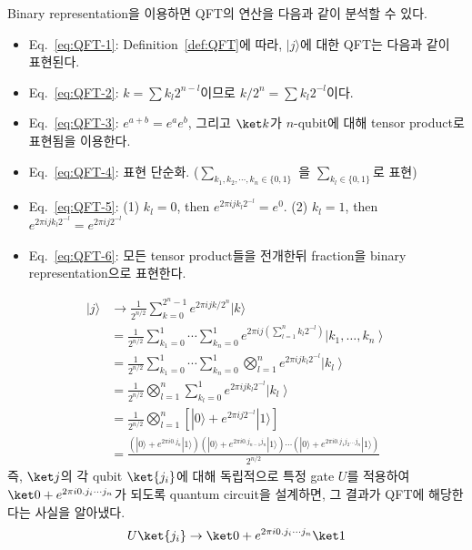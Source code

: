 \newpage
Binary representation을 이용하면 QFT의 연산을 다음과 같이 분석할 수 있다.
\begin{itemize}
  \item Eq.~\eqref{eq:QFT-1}: Definition~\ref{def:QFT}에 따라, $|j\rangle$에 대한 QFT는 다음과 같이 표현된다.
  \item Eq.~\eqref{eq:QFT-2}: $k = \sum k_l 2^{n-l}$이므로 $k/2^n = \sum k_l 2^{-l}$이다.
  \item Eq.~\eqref{eq:QFT-3}: $e^{a+b} = e^a e^b$, 그리고 $\ket k$가 $n$-qubit에 대해 tensor product로 표현됨을 이용한다.
  \item Eq.~\eqref{eq:QFT-4}: 표현 단순화. ($\sum_{k_1, k_2, \cdots, k_n \in \{0, 1\}}$ 을 $\sum_{k_l \in \{0, 1\}}$로 표현)
  \item Eq.~\eqref{eq:QFT-5}: (1) $k_l=0$, then $e^{2\pi ij k_l 2^{-l}} = e^0$. (2) $k_l=1$, then $e^{2\pi ij k_l 2^{-l}} = e^{2\pi i j 2^{-l}}$
  \item Eq.~\eqref{eq:QFT-6}: 모든 tensor product들을 전개한뒤 fraction을 binary representation으로 표현한다.
\end{itemize}
\begin{align}
  |j\rangle & \rightarrow \frac{1}{2^{n / 2}} \sum_{k=0}^{2^n-1} e^{2 \pi i j k / 2^n}|k\rangle \label{eq:QFT-1} \\
  & =\frac{1}{2^{n / 2}} \sum_{k_1=0}^1 \cdots \sum_{k_n=0}^1 e^{2 \pi i j\left(\sum_{l=1}^n k_l 2^{-l}\right)}\left|k_1, \ldots, k_n\right\rangle \label{eq:QFT-2} \\
  & =\frac{1}{2^{n / 2}} \sum_{k_1=0}^1 \cdots \sum_{k_n=0}^1 \bigotimes_{l=1}^n e^{2 \pi i j k_l 2^{-l}}\left|k_l\right\rangle  \label{eq:QFT-3} \\
  & =\frac{1}{2^{n / 2}} \bigotimes_{l=1}^n \sum_{k_l=0}^1 e^{2 \pi i j k_l 2^{-l}}\left|k_l\right\rangle \label{eq:QFT-4} \\
  & =\frac{1}{2^{n / 2}} \bigotimes_{l=1}^n\left[|0\rangle+e^{2 \pi i j 2^{-l}}|1\rangle\right]  \label{eq:QFT-5} \\
  & =\frac{\left(|0\rangle+e^{2 \pi i 0 . j_n}|1\rangle\right)\left(|0\rangle+e^{2 \pi i 0 . j_{n-1} j_n}|1\rangle\right) \cdots\left(|0\rangle+e^{2 \pi i 0 . j_1 j_2 \ldots j_n}|1\rangle\right)}{2^{n / 2}} \label{eq:QFT-6}
\end{align}
즉, $\ket j$의 각 qubit $\ket{j_i}$에 대해 독립적으로 특정 gate $U$를 적용하여 $\ket 0 + e^{2\pi i 0.j_i \cdots j_n}$가 되도록 quantum circuit을 설계하면, 그 결과가 QFT에 해당한다는 사실을 알아냈다.
\begin{equation*}
  U \ket {j_i} \rightarrow \ket 0 + e^{2\pi i 0.j_i \cdots j_n} \ket 1
\end{equation*}


